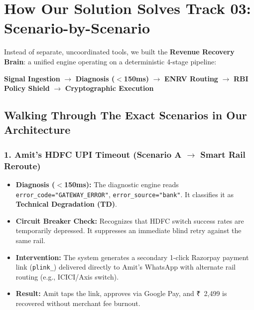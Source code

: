 \documentclass[11pt, a4paper]{article}
\newcommand{\INR}{{\rupeefont ₹}}
\begin{document}
\newpage
\section{How Our Solution Solves Track 03: Scenario-by-Scenario}

Instead of separate, uncoordinated tools, we built the \textbf{Revenue Recovery Brain}: a unified engine operating on a deterministic 4-stage pipeline:

\begin{center}
  \textbf{Signal Ingestion} $\longrightarrow$ \textbf{Diagnosis ($<$150ms)} $\longrightarrow$ \textbf{ENRV Routing} $\longrightarrow$ \textbf{RBI Policy Shield} $\longrightarrow$ \textbf{Cryptographic Execution}
\end{center}

\subsection{Walking Through The Exact Scenarios in Our Architecture}

\subsubsection{1. Amit's HDFC UPI Timeout (Scenario A $\rightarrow$ Smart Rail Reroute)}
\begin{itemize}[leftmargin=1.5em, itemsep=2pt]
  \item \textbf{Diagnosis ($<$150ms):} The diagnostic engine reads \texttt{error\_code="GATEWAY\_ERROR"}, \texttt{error\_source="bank"}. It classifies it as \textbf{Technical Degradation (TD)}.
  \item \textbf{Circuit Breaker Check:} Recognizes that HDFC switch success rates are temporarily depressed. It suppresses an immediate blind retry against the same rail.
  \item \textbf{Intervention:} The system generates a secondary 1-click Razorpay payment link (\texttt{plink\_}) delivered directly to Amit's WhatsApp with alternate rail routing (e.g., ICICI/Axis switch).
  \item \textbf{Result:} Amit taps the link, approves via Google Pay, and \INR~2,499 is recovered without merchant fee burnout.
\end{itemize}
\end{document}
